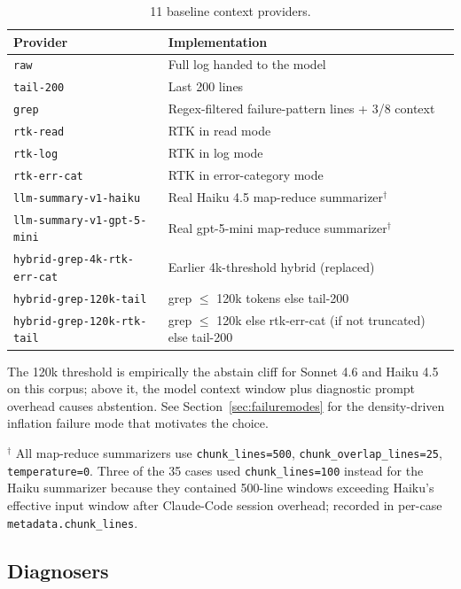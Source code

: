\documentclass{article}
\begin{document}
\begin{table}[h]
\centering
\small
\caption{11 baseline context providers.}
\label{tab:baselines}
\begin{tabular}{ll}
\toprule
\textbf{Provider} & \textbf{Implementation} \\
\midrule
\texttt{raw} & Full log handed to the model \\
\texttt{tail-200} & Last 200 lines \\
\texttt{grep} & Regex-filtered failure-pattern lines + 3/8 context \\
\texttt{rtk-read} & RTK in read mode \\
\texttt{rtk-log} & RTK in log mode \\
\texttt{rtk-err-cat} & RTK in error-category mode \\
\texttt{llm-summary-v1-haiku}     & Real Haiku 4.5 map-reduce summarizer$^{\dagger}$ \\
\texttt{llm-summary-v1-gpt-5-mini} & Real gpt-5-mini map-reduce summarizer$^{\dagger}$ \\
\texttt{hybrid-grep-4k-rtk-err-cat} & Earlier 4k-threshold hybrid (replaced) \\
\texttt{hybrid-grep-120k-tail} & grep $\leq$ 120k tokens else tail-200 \\
\texttt{hybrid-grep-120k-rtk-tail} & grep $\leq$ 120k else rtk-err-cat (if not truncated) else tail-200 \\
\bottomrule
\end{tabular}
\end{table}

The 120k threshold is empirically the abstain cliff for Sonnet 4.6
and Haiku 4.5 on this corpus; above it, the model context window
plus diagnostic prompt overhead causes abstention. See
Section~\ref{sec:failuremodes} for the density-driven inflation
failure mode that motivates the choice.

$^{\dagger}$ All map-reduce summarizers use \texttt{chunk\_lines=500},
\texttt{chunk\_overlap\_lines=25}, \texttt{temperature=0}. Three of
the 35 cases used \texttt{chunk\_lines=100} instead for the Haiku
summarizer because they contained 500-line windows exceeding
Haiku's effective input window after Claude-Code session overhead;
recorded in per-case \texttt{metadata.chunk\_lines}.

\subsection{Diagnosers}
\end{document}
